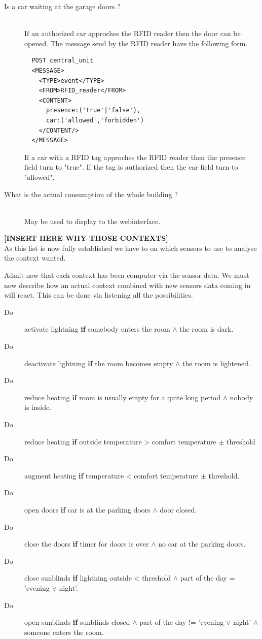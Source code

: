 \documentclass{acm_proc_article-sp}
\begin{document}
\begin{description}
 \item[Is a car waiting at the garage doors ?] \hfill \\
 If an authorized car approches the RFID reader then the door can be opened.
 The message send by the RFID reader have the following form.
  \begin{verbatim}
  POST central_unit 
  <MESSAGE>
    <TYPE>event</TYPE>
    <FROM>RFID_reader</FROM>
    <CONTENT>
      presence:('true'|'false'),
      car:('allowed','forbidden')
    </CONTENT/>
  </MESSAGE> 
\end{verbatim}
If a car with a RFID tag approches the RFID reader then the presence field turn to "true". If the tag is authorized then the car field turn to "allowed".
 \item[What is the actual consumption of the whole building ?]\hfill \\
 May be used to display to the webinterface.
\end{description}
\textbf{[INSERT HERE WHY THOSE CONTEXTS]}\\
As this list is now fully established we have to on which sensors to use to analyse the context wanted.

Admit now that each context has been computer via the sensor data.
We must now describe how an actual context combined with new sensors data coming in will react. 
This can be done via listening all the possibilities.
\begin{description}
 \item[Do] activate lightning \textbf{if} somebody enters the room $\land$ the room is dark.
 \item[Do] deactivate lightning \textbf{if} the room becomes empty $\land$ the room is lightened.
 \item[Do] reduce heating \textbf{if} room is usually empty for a quite long period $\land$ nobody is inside.
 \item[Do] reduce heating \textbf{if} outside temperature > comfort temperature $\pm$ threshold
 \item[Do] augment heating \textbf{if} temperature < comfort temperature $\pm$ threshold.
 \item[Do] open doors \textbf{if} car is at the parking doors $\land$ door closed.
 \item[Do] close the doors \textbf{if} timer for doors is over $\land$ no car at the parking doors.
 \item[Do] close sunblinds \textbf{if} lightning outside < threshold $\land$ part of the day = ’evening $\lor$ night’.
 \item[Do] open sunblinds \textbf{if} sunblinds closed $\land$ part of the day != ’evening $\lor$ night’ $\land$ someone enters the room.
\end{description}
\end{document}
